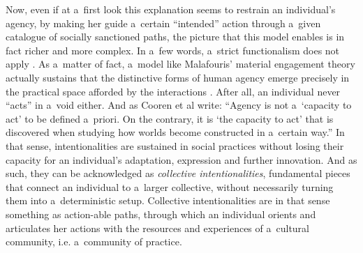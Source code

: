 Now, even if at a~first look this explanation seems to restrain an individual's agency, by making her guide a~certain ``intended'' action through a~given catalogue of socially sanctioned paths, the picture that this model enables is in fact richer and more complex. In a~few words, a~strict functionalism does not apply
\parencites[][]{elster_explaining_1983}[][p.32ff]{douglas_how_1986}. %
 As a~matter of fact, a~model like Malafouris' material engagement theory actually sustains that the distinctive forms of human agency emerge precisely in the practical space afforded by the interactions 
\parencites*[][]{malafouris_at_2008}[][]{malafouris_metaplasticity_2015}. %
 After all, an individual never ``acts'' in a~void either. And as Cooren et al 
\parencite*[][p.11]{cooren_communication_2006} %
 write: ``Agency is not a~‘capacity to act' to be defined a~priori. On the contrary, it is ‘the capacity to act' that is discovered when studying how worlds become constructed in a~certain way.'' In that sense, intentionalities are sustained in social practices without losing their capacity for an individual's adaptation, expression and further innovation. And as such, they can be acknowledged as \textit{collective intentionalities}, fundamental pieces that connect an individual to a~larger collective, without necessarily turning them into a~deterministic setup. Collective intentionalities are in that sense something as action-able paths, through which an individual orients and articulates her actions with the resources and experiences of a~cultural community, i.e. a~community of practice.


